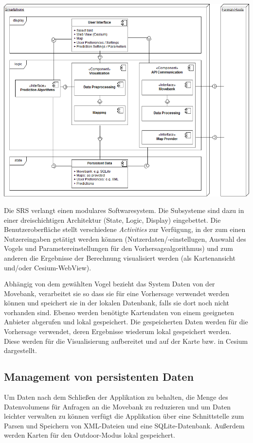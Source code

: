 \documentclass[12pt]{article} %
\begin{document}
\includegraphics[width = \textwidth]{Diagramme/ComponentDiagram.png}

Die SRS verlangt einen modulares Softwaresystem. Die Subsysteme sind dazu in einer dreischichtigen Architektur (State, Logic, Display) eingebettet. Die Benutzeroberfläche stellt verschiedene \textit{Activities} zur Verfügung, in der zum einen Nutzereingaben getätigt werden können (Nutzerdaten/-einstellugen, Auswahl des Vogels und Parametereinstellungen für den Vorhersagealgorithmus) und zum anderen die Ergebnisse der Berechnung visualisiert werden (als Kartenansicht und/oder Cesium-WebView).

Abhängig von dem gewählten Vogel bezieht das System Daten von der Movebank, verarbeitet sie so dass sie für eine Vorhersage verwendet werden können und speichert sie in der lokalen Datenbank, falls sie dort noch nicht vorhanden sind. Ebenso werden benötigte Kartendaten von einem geeigneten Anbieter abgerufen und lokal gespeichert. Die gespeicherten Daten werden für die Vorhersage verwendet, deren Ergebnisse wiederum lokal gespeichert werden. Diese werden für die Visualisierung aufbereitet und auf der Karte bzw. in Cesium dargestellt.

\subsection{Management von persistenten Daten}

Um Daten nach dem Schließen der Applikation zu behalten, die Menge des Datenvolumens für Anfragen an die Movebank zu reduzieren und um Daten leichter verwalten zu können verfügt die Applikation über eine Schnittstelle zum Parsen und Speichern von XML-Dateien und eine SQLite-Datenbank. Außerdem werden Karten für den Outdoor-Modus lokal gespeichert.
\end{document}
